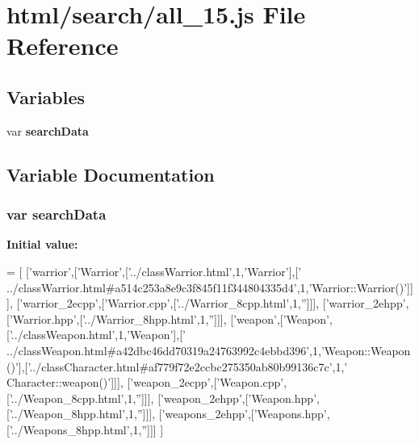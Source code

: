 \section{html/search/all\-\_\-15.js File Reference}
\label{all__15_8js}
\subsection*{Variables}
\begin{DoxyCompactItemize}
\item 
var {\bf search\-Data}
\end{DoxyCompactItemize}


\subsection{Variable Documentation}
\subsubsection[{search\-Data}]{\setlength{\rightskip}{0pt plus 5cm}var search\-Data}\label{all__15_8js_ad01a7523f103d6242ef9b0451861231e}
{\bfseries Initial value\-:}
\begin{DoxyCode}
=
[
  [\textcolor{stringliteral}{'warrior'},[\textcolor{stringliteral}{'Warrior'},[\textcolor{stringliteral}{'../classWarrior.html'},1,\textcolor{stringliteral}{'Warrior'}],[\textcolor{stringliteral}{'
      ../classWarrior.html#a514c253a8e9c3f845f11f344804335d4'},1,\textcolor{stringliteral}{'Warrior::Warrior()'}]]],
  [\textcolor{stringliteral}{'warrior\_2ecpp'},[\textcolor{stringliteral}{'Warrior.cpp'},[\textcolor{stringliteral}{'../Warrior\_8cpp.html'},1,\textcolor{stringliteral}{''}]]],
  [\textcolor{stringliteral}{'warrior\_2ehpp'},[\textcolor{stringliteral}{'Warrior.hpp'},[\textcolor{stringliteral}{'../Warrior\_8hpp.html'},1,\textcolor{stringliteral}{''}]]],
  [\textcolor{stringliteral}{'weapon'},[\textcolor{stringliteral}{'Weapon'},[\textcolor{stringliteral}{'../classWeapon.html'},1,\textcolor{stringliteral}{'Weapon'}],[\textcolor{stringliteral}{'
      ../classWeapon.html#a42dbc46dd70319a24763992c4ebbd396'},1,\textcolor{stringliteral}{'Weapon::Weapon()'}],[\textcolor{stringliteral}{'../classCharacter.html#af779f72e2ccbc275350ab80b99136c7c'},1,\textcolor{stringliteral}{'
      Character::weapon()'}]]],
  [\textcolor{stringliteral}{'weapon\_2ecpp'},[\textcolor{stringliteral}{'Weapon.cpp'},[\textcolor{stringliteral}{'../Weapon\_8cpp.html'},1,\textcolor{stringliteral}{''}]]],
  [\textcolor{stringliteral}{'weapon\_2ehpp'},[\textcolor{stringliteral}{'Weapon.hpp'},[\textcolor{stringliteral}{'../Weapon\_8hpp.html'},1,\textcolor{stringliteral}{''}]]],
  [\textcolor{stringliteral}{'weapons\_2ehpp'},[\textcolor{stringliteral}{'Weapons.hpp'},[\textcolor{stringliteral}{'../Weapons\_8hpp.html'},1,\textcolor{stringliteral}{''}]]]
]
\end{DoxyCode}
